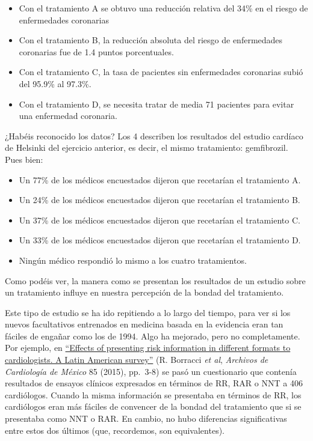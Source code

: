 \documentclass[
]{book}
\theoremstyle{definition}
\theoremstyle{definition}
\theoremstyle{definition}
\theoremstyle{definition}
\theoremstyle{remark}
\begin{document}
\begin{itemize}
\item
  Con el tratamiento A se obtuvo una reducción relativa del 34\% en el riesgo de enfermedades coronarias
\item
  Con el tratamiento B, la reducción absoluta del riesgo de enfermedades coronarias fue de 1.4 puntos porcentuales.
\item
  Con el tratamiento C, la tasa de pacientes sin enfermedades coronarias subió del 95.9\% al 97.3\%.
\item
  Con el tratamiento D, se necesita tratar de media 71 pacientes para evitar una enfermedad coronaria.
\end{itemize}

¿Habéis reconocido los datos? Los 4 describen los resultados del estudio cardíaco de Helsinki del ejercicio anterior, es decir, el mismo tratamiento: gemfibrozil. Pues bien:

\begin{itemize}
\item
  Un 77\% de los médicos encuestados dijeron que recetarían el tratamiento A.
\item
  Un 24\% de los médicos encuestados dijeron que recetarían el tratamiento B.
\item
  Un 37\% de los médicos encuestados dijeron que recetarían el tratamiento C.
\item
  Un 33\% de los médicos encuestados dijeron que recetarían el tratamiento D.
\item
  Ningún médico respondió lo mismo a los cuatro tratamientos.
\end{itemize}

Como podéis ver, la manera como se presentan los resultados de un estudio sobre un tratamiento influye en nuestra percepción de la bondad del tratamiento.

Este tipo de estudio se ha ido repitiendo a lo largo del tiempo, para ver si los nuevos facultativos entrenados en medicina basada en la evidencia eran tan fáciles de engañar como los de 1994. Algo ha mejorado, pero no completamente. Por ejemplo, en \href{http://www.archivoscardiologia.com/previos/(2015)\%20ACM\%20Vol\%2085.\%201\%20ENERO-MARZO/ACMX_2015_85_1_003-008.pdf}{``Effects of presenting risk information in different formats to cardiologists. A Latin American survey''}
(R. Borracci \emph{et al}, \emph{Archivos de Cardiología de México} 85 (2015), pp.~3-8) se pasó un cuestionario que contenía resultados de ensayos clínicos expresados en términos de RR, RAR o NNT a 406 cardiólogos. Cuando la misma información se presentaba en términos de RR, los cardiólogos eran más fáciles de convencer de la bondad del tratamiento que si se presentaba como NNT o RAR. En cambio, no hubo diferencias significativas entre estos dos últimos (que, recordemos, son equivalentes).
\end{document}
